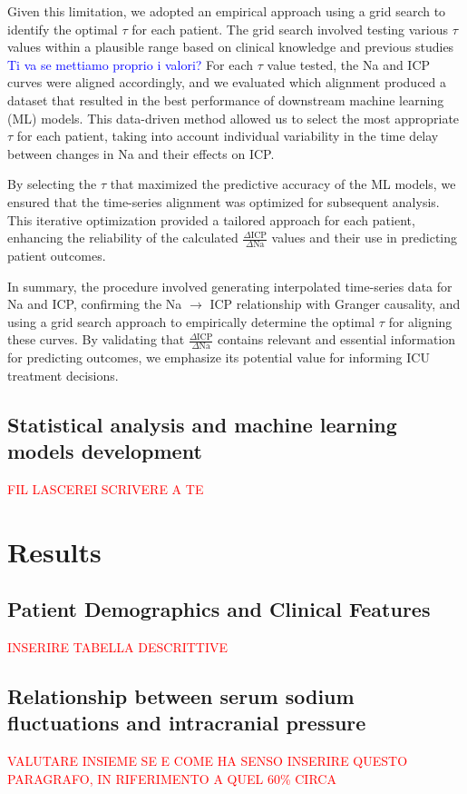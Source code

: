 Given this limitation, we adopted an empirical approach using a grid search to identify the optimal $\tau$ for each patient. The grid search involved testing various $\tau$ values within a plausible range based on clinical knowledge and previous studies \textcolor{blue}{Ti va se mettiamo proprio i valori?} For each $\tau$ value tested, the Na and ICP curves were aligned accordingly, and we evaluated which alignment produced a dataset that resulted in the best performance of downstream machine learning (ML) models. This data-driven method allowed us to select the most appropriate $\tau$ for each patient, taking into account individual variability in the time delay between changes in Na and their effects on ICP.

By selecting the $\tau$ that maximized the predictive accuracy of the ML models, we ensured that the time-series alignment was optimized for subsequent analysis. This iterative optimization provided a tailored approach for each patient, enhancing the reliability of the calculated \(\frac{\Delta \text{ICP}}{\Delta \text{Na}}\) values and their use in predicting patient outcomes.

In summary, the procedure involved generating interpolated time-series data for Na and ICP, confirming the Na $\rightarrow$ ICP relationship with Granger causality, and using a grid search approach to empirically determine the optimal $\tau$ for aligning these curves. By validating that \(\frac{\Delta \text{ICP}}{\Delta \text{Na}}\) contains relevant and essential information for predicting outcomes, we emphasize its potential value for informing ICU treatment decisions.




\subsection{Statistical analysis and machine learning models development}
\textcolor{red}{FIL LASCEREI SCRIVERE A TE}

\section {Results}
\subsection{Patient Demographics and Clinical Features}
\textcolor{red}{INSERIRE TABELLA DESCRITTIVE}

\subsection{Relationship between serum sodium fluctuations and intracranial pressure}
\textcolor{red}{VALUTARE INSIEME SE E COME HA SENSO INSERIRE QUESTO PARAGRAFO, IN RIFERIMENTO A QUEL 60\% CIRCA}

